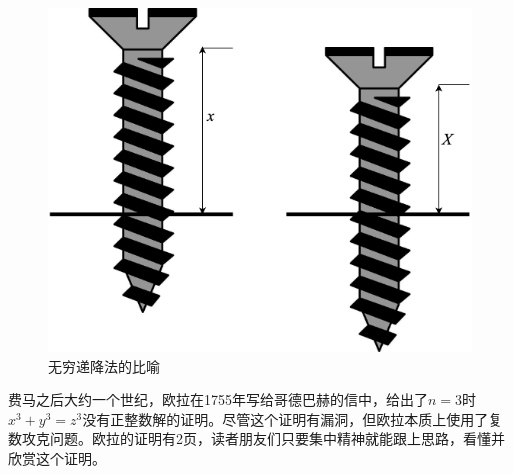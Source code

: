 \documentclass[b5paper]{ctexart}
\begin{document}
\begin{figure}[htbp]
 \centering
 \includegraphics[scale=0.3]{img/infinite-descent}
 \caption{无穷递降法的比喻}
 \label{fig:infinite-descent}
\end{figure}

费马之后大约一个世纪，欧拉在1755年写给哥德巴赫的信中，给出了$n = 3$时$x^3 + y^3 = z^3$没有正整数解的证明。尽管这个证明有漏洞，但欧拉本质上使用了复数攻克问题。欧拉的证明有2页，读者朋友们只要集中精神就能跟上思路，看懂并欣赏这个证明。
\end{document}

